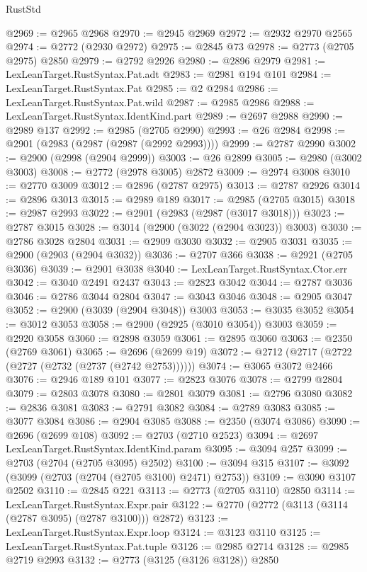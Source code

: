 \begin{lexlean}{RustStd}
\begin{coremodule}
@2969 := @2965 @2968
@2970 := @2945 @2969
@2972 := @2932 @2970 @2565
@2974 := @2772 (@2930 @2972)
@2975 := @2845 @73
@2978 := @2773 (@2705 @2975) @2850
@2979 := @2792 @2926
@2980 := @2896 @2979
@2981 := LexLeanTarget.RustSyntax.Pat.adt
@2983 := @2981 @194 @101
@2984 := LexLeanTarget.RustSyntax.Pat
@2985 := @2 @2984
@2986 := LexLeanTarget.RustSyntax.Pat.wild
@2987 := @2985 @2986
@2988 := LexLeanTarget.RustSyntax.IdentKind.part
@2989 := @2697 @2988
@2990 := @2989 @137
@2992 := @2985 (@2705 @2990)
@2993 := @26 @2984
@2998 := @2901 (@2983 (@2987 (@2987 (@2992 @2993))))
@2999 := @2787 @2990
@3002 := @2900 (@2998 (@2904 @2999))
@3003 := @26 @2899
@3005 := @2980 (@3002 @3003)
@3008 := @2772 (@2978 @3005) @2872
@3009 := @2974 @3008
@3010 := @2770 @3009
@3012 := @2896 (@2787 @2975)
@3013 := @2787 @2926
@3014 := @2896 @3013
@3015 := @2989 @189
@3017 := @2985 (@2705 @3015)
@3018 := @2987 @2993
@3022 := @2901 (@2983 (@2987 (@3017 @3018)))
@3023 := @2787 @3015
@3028 := @3014 (@2900 (@3022 (@2904 @3023)) @3003)
@3030 := @2786 @3028 @2804
@3031 := @2909 @3030
@3032 := @2905 @3031
@3035 := @2900 (@2903 (@2904 @3032))
@3036 := @2707 @366
@3038 := @2921 (@2705 @3036)
@3039 := @2901 @3038
@3040 := LexLeanTarget.RustSyntax.Ctor.err
@3042 := @3040 @2491 @2437
@3043 := @2823 @3042
@3044 := @2787 @3036
@3046 := @2786 @3044 @2804
@3047 := @3043 @3046
@3048 := @2905 @3047
@3052 := @2900 (@3039 (@2904 @3048)) @3003
@3053 := @3035 @3052
@3054 := @3012 @3053
@3058 := @2900 (@2925 (@3010 @3054)) @3003
@3059 := @2920 @3058
@3060 := @2898 @3059
@3061 := @2895 @3060
@3063 := @2350 (@2769 @3061)
@3065 := @2696 (@2699 @19)
@3072 := @2712 (@2717 (@2722 (@2727 (@2732 (@2737 (@2742 @2753))))))
@3074 := @3065 @3072 @2466
@3076 := @2946 @189 @101
@3077 := @2823 @3076
@3078 := @2799 @2804
@3079 := @2803 @3078
@3080 := @2801 @3079
@3081 := @2796 @3080
@3082 := @2836 @3081
@3083 := @2791 @3082
@3084 := @2789 @3083
@3085 := @3077 @3084
@3086 := @2904 @3085
@3088 := @2350 (@3074 @3086)
@3090 := @2696 (@2699 @108)
@3092 := @2703 (@2710 @2523)
@3094 := @2697 LexLeanTarget.RustSyntax.IdentKind.param
@3095 := @3094 @257
@3099 := @2703 (@2704 (@2705 @3095) @2502)
@3100 := @3094 @315
@3107 := @3092 (@3099 (@2703 (@2704 (@2705 @3100) @2471) @2753))
@3109 := @3090 @3107 @2502
@3110 := @2845 @221
@3113 := @2773 (@2705 @3110) @2850
@3114 := LexLeanTarget.RustSyntax.Expr.pair
@3122 := @2770 (@2772 (@3113 (@3114 (@2787 @3095) (@2787 @3100))) @2872)
@3123 := LexLeanTarget.RustSyntax.Expr.loop
@3124 := @3123 @3110
@3125 := LexLeanTarget.RustSyntax.Pat.tuple
@3126 := @2985 @2714
@3128 := @2985 @2719 @2993
@3132 := @2773 (@3125 (@3126 @3128)) @2850

\end{coremodule}
\end{lexlean}
